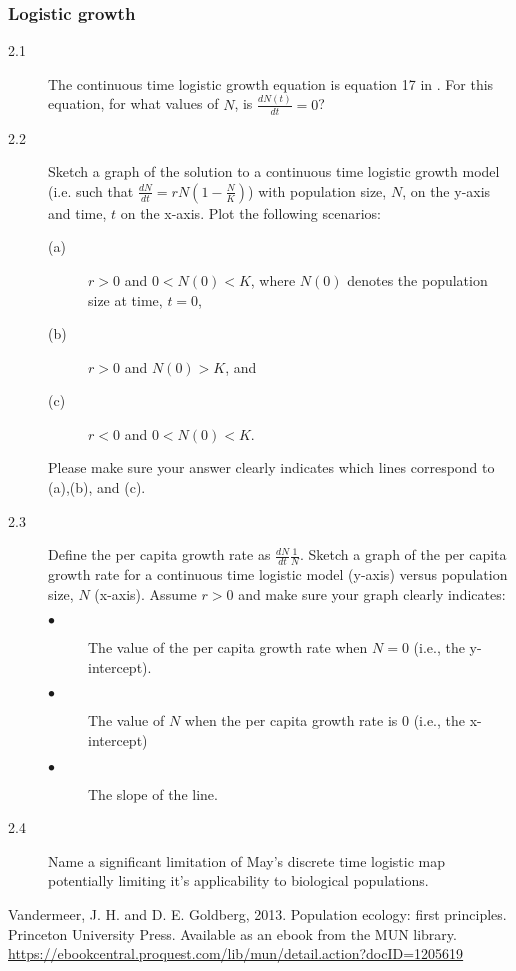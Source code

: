 \documentclass[10pt, oneside]{article}   	%
\begin{document}
\subsubsection*{Logistic growth}
\begin{description}
\item[2.1] The continuous time logistic growth equation is equation 17 in \cite{vandermeer}. For this equation, for what values of $N$, is $\frac{dN(t)}{dt}=0$?
\item[2.2] Sketch a graph of the solution to a continuous time logistic growth model (i.e. such that $\frac{dN}{dt} = rN\left(1-\frac{N}{K}\right)$) with population size, $N$, on the y-axis and time, $t$ on the x-axis. Plot the following scenarios:
\begin{description}
\item[(a)] $r > 0$ and $0<N(0)<K$, where $N(0)$ denotes the population size at time, $t=0$,
\item[(b)] $r > 0$ and $N(0)>K$, and
\item[(c)] $r < 0$ and  $0<N(0)<K$. 
\end{description}
Please make sure your answer clearly indicates which lines correspond to (a),(b), and (c).
\item[2.3] Define the per capita growth rate as $\frac{dN}{dt}\frac{1}{N}$. Sketch a graph of the per capita growth rate for a continuous time logistic model (y-axis) versus population size, $N$ (x-axis). Assume $r>0$ and make sure your graph clearly indicates:
\begin{description}
\item[$\bullet$] The value of the per capita growth rate when $N = 0$ (i.e., the y-intercept).
\item[$\bullet$] The value of $N$ when the per capita growth rate is 0 (i.e., the x-intercept)
\item[$\bullet$] The slope of the line.
\end{description}  
\item[2.4] Name a significant limitation of May's discrete time logistic map potentially limiting it's applicability to biological populations.
\end{description}

\begin{thebibliography}{10}
 Vandermeer, J. H. and D. E. Goldberg, 2013. Population ecology: first principles. Princeton University Press. Available as an ebook from the MUN library. \url{https://ebookcentral.proquest.com/lib/mun/detail.action?docID=1205619}
\end{thebibliography}
\end{document}
